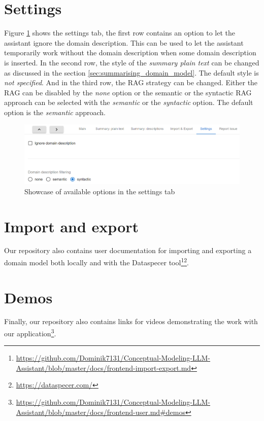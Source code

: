 \section{Settings}

Figure \ref{fig:settings_tab} shows the settings tab, the first row contains an option to let the assistant ignore the domain description. This can be used to let the assistant temporarily work without the domain description when some domain description is inserted. In the second row, the style of the \emph{summary plain text} can be changed as discussed in the section \ref{sec:summarising_domain_model}. The default style is \textit{not specified}. And in the third row, the RAG strategy can be changed. Either the RAG can be disabled by the \textit{none} option or the semantic or the syntactic RAG approach can be selected with the \textit{semantic} or the \textit{syntactic} option. The default option is the \textit{semantic} approach.

\begin{figure}[!h]
    \includegraphics[scale=0.46]{../docs/images/frontend/settings.png}
    \caption{\centering Showcase of available options in the settings tab}
    \label{fig:settings_tab}
\end{figure}


\section{Import and export}

Our repository also contains user documentation for importing and exporting a domain model both locally and with the Dataspecer tool\footnote{\url{https://github.com/Dominik7131/Conceptual-Modeling-LLM-Assistant/blob/master/docs/frontend-import-export.md}}\footnote{\url{https://dataspecer.com/}}.


\section{Demos}

Finally, our repository also contains links for videos demonstrating the work with our application\footnote{\url{https://github.com/Dominik7131/Conceptual-Modeling-LLM-Assistant/blob/master/docs/frontend-user.md\#demos}}.
